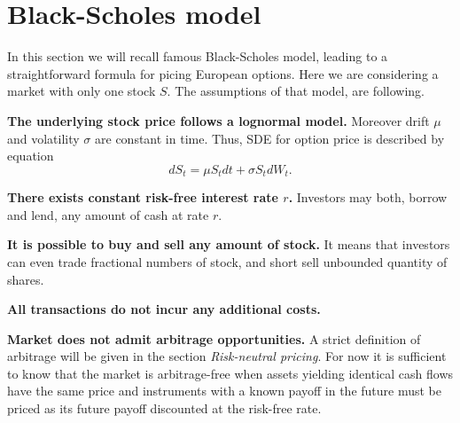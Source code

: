 \documentclass[a4paper,12pt, twoside]{book}
\theoremstyle{definition}
\theoremstyle{remark}
\begin{document}
\section{Black-Scholes model}
In this section we will recall famous Black-Scholes model, leading to a straightforward formula for picing European options. Here we are considering a market with only one stock $S$. The assumptions of that model, are following.

\noindent \textbf{The underlying stock price follows a lognormal model.} Moreover drift $\mu$ and volatility $\sigma$ are constant in time. Thus, SDE for option price is described by equation
\begin{equation}
 \label{eq:stockDynamics}
 dS_t = \mu S_t dt + \sigma S_t dW_t. 
\end{equation}

\noindent \textbf{There exists constant risk-free interest rate $r$.} Investors may both, borrow and lend, any amount of cash at rate $r$.

\noindent \textbf{It is possible to buy and sell any amount of stock.} It means that investors can even trade fractional numbers of stock, and short sell unbounded quantity of shares.

\noindent \textbf{All transactions do not incur any additional costs.}

\noindent \textbf{Market does not admit arbitrage opportunities.} A strict definition of arbitrage will be given in the section \textit{Risk-neutral pricing}. For now it is sufficient to know that the market is arbitrage-free when assets yielding identical cash flows have the same price and instruments with a known payoff in the future must be priced as its future payoff discounted at the risk-free rate.
\end{document}
